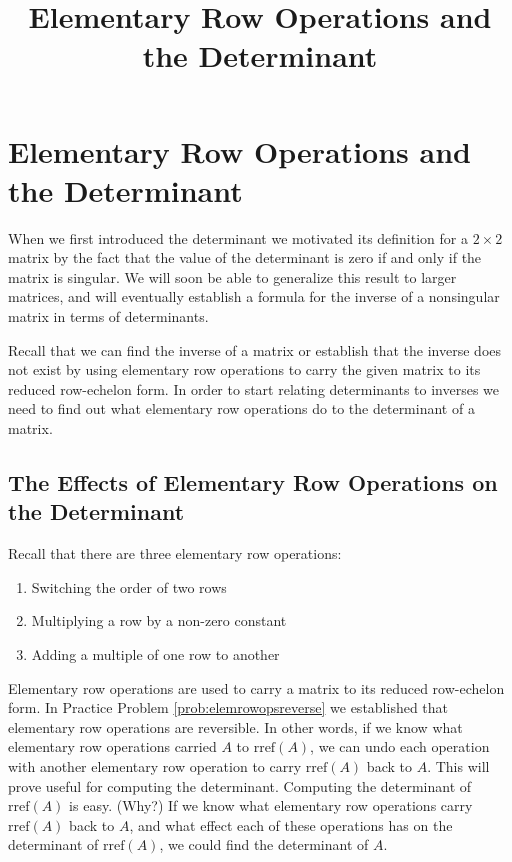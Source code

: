 \documentclass{ximera}
\title{Elementary Row Operations and the Determinant} \license{CC BY-NC-SA 4.0}
\begin{document}
\begin{abstract}
 \end{abstract}
\maketitle

\section*{Elementary Row Operations and the Determinant}
When we first introduced the determinant we motivated its definition for a $2\times 2$ matrix by the fact that the value of the determinant is zero if and only if the matrix is singular.  We will soon be able to generalize this result to larger matrices, and will eventually establish a formula for the inverse of a nonsingular matrix in terms of determinants.  

Recall that we can find the inverse of a matrix or establish that the inverse does not exist by using elementary row operations to carry the given matrix to its reduced row-echelon form.  In order to start relating determinants to inverses we need to find out what elementary row operations do to the determinant of a matrix.  

\subsection*{The Effects of Elementary Row Operations on the Determinant}
Recall that there are three elementary row operations:
\begin{enumerate}
\item Switching the order of two rows
\item Multiplying a row by a non-zero constant
\item Adding a multiple of one row to another
\end{enumerate}

Elementary row operations are used to carry a matrix to its reduced row-echelon form.  In Practice Problem \ref{prob:elemrowopsreverse} we established that elementary row operations are reversible.  In other words, if we know what elementary row operations   carried $A$ to $\mbox{rref}(A)$, we can undo each operation with another elementary row operation to carry $\mbox{rref}(A)$ back to $A$.  This will prove useful for computing the determinant.  Computing the determinant of $\mbox{rref}(A)$ is easy. (Why?)  If we know what elementary row operations carry $\mbox{rref}(A)$ back to $A$, and what effect each of these operations has on the determinant of $\mbox{rref}(A)$, we could find the determinant of $A$.  
\end{document}
